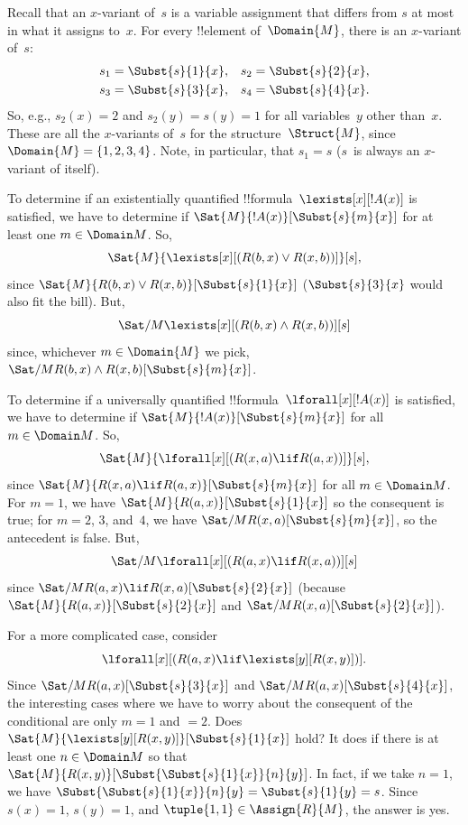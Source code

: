 \begin{ex}
Recall that an $x$-variant of~$s$ is a variable assignment that
differs from $s$ at most in what it assigns to~$x$. For every
!!{element} of~$\Domain{M}$, there is an $x$-variant of~$s$:
\begin{align*}
  s_1 & = \Subst{s}{1}{x}, &
  s_2 & = \Subst{s}{2}{x},\\
  s_3 & = \Subst{s}{3}{x}, &
  s_4 & = \Subst{s}{4}{x}.
\end{align*}
So, e.g., $s_2(x) = 2$ and $s_2(y) = s(y) = 1$ for all variables~$y$
other than~$x$. These are all the $x$-variants of~$s$ for the
structure~$\Struct{M}$, since $\Domain{M} = \{1, 2, 3, 4\}$. Note, in
particular, that $s_1 = s$ ($s$~is always an $x$-variant of itself).

To determine if an existentially quantified
  !!{formula}~$\lexists[x][!A(x)]$ is satisfied, we have to determine
  if $\Sat{M}{!A(x)}[\Subst{s}{m}{x}]$ for at least one $m \in \Domain
  M$. So,
  \[
  \Sat{M}{\lexists[x][(R(b,x) \lor R(x,b))]}[s],
  \]
  since $\Sat{M}{R(b,x) \lor R(x, b)}[\Subst{s}{1}{x}]$
  ($\Subst{s}{3}{x}$ would also fit the bill).  But,
  \[
  \Sat/{M}{\lexists[x][(R(b,x) \land R(x,b))]}[s]
  \]
  since, whichever $m \in \Domain{M}$ we pick, $\Sat/{M}{R(b,x) \land R(x,b)}[\Subst{s}{m}{x}]$.

To determine if a universally quantified
  !!{formula}~$\lforall[x][!A(x)]$ is satisfied, we have to determine
  if $\Sat{M}{!A(x)}[\Subst{s}{m}{x}]$ for all $m \in \Domain M$. So,
  \[
  \Sat{M}{\lforall[x][(R(x,a) \lif R(a,x))]}[s],
  \]
  since $\Sat{M}{R(x,a) \lif R(a,x)}[\Subst{s}{m}{x}]$ for all $m \in
  \Domain M$. For $m = 1$, we have $\Sat{M}{R(a,x)}[\Subst{s}{1}{x}]$
  so the consequent is true; for $m = 2$, $3$, and~$4$, we have
  $\Sat/{M}{R(x,a)}[\Subst{s}{m}{x}]$, so the antecedent is false.
  But,
  \[
  \Sat/{M}{\lforall[x][(R(a,x) \lif R(x,a))]}[s]
  \]
  since $\Sat/{M}{R(a,x) \lif R(x,a)}[\Subst{s}{2}{x}]$ (because
  $\Sat{M}{R(a, x)}[\Subst{s}{2}{x}]$ and $\Sat/{M}{R(x,
  a)}[\Subst{s}{2}{x}]$).





For a more complicated case, consider
\[
\lforall[x][(R(a,x) \lif \lexists[y][R(x,y)])].
\]
Since $\Sat/{M}{R(a,x)}[\Subst{s}{3}{x}]$ and
$\Sat/{M}{R(a,x)}[\Subst{s}{4}{x}]$, the interesting cases where we
have to worry about the consequent of the conditional are only $m = 1$
and $ = 2$. Does $\Sat{M}{\lexists[y][R(x,y)]}[\Subst{s}{1}{x}]$
hold? It does if there is at least one $n \in \Domain M$ so that
$\Sat{M}{R(x,y)}[\Subst{\Subst{s}{1}{x}}{n}{y}]$. In fact, if we take
$n = 1$, we have $\Subst{\Subst{s}{1}{x}}{n}{y} = \Subst{s}{1}{y} =
s$. Since $s(x) = 1$, $s(y) = 1$, and $\tuple{1,1} \in \Assign{R}{M}$,
the answer is yes. 


\end{ex}
